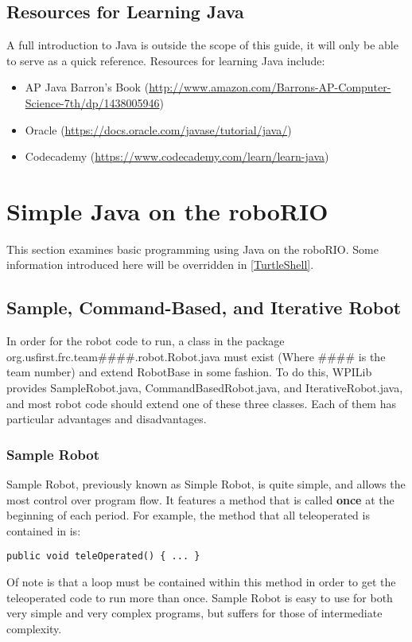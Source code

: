 \documentclass[]{report}
\begin{document}
\subsection{Resources for Learning Java}
A full introduction to Java is outside the scope of this guide, it will only be able to serve as a quick reference.
Resources for learning Java include:
\begin{itemize}
\item AP Java Barron's Book (\url{http://www.amazon.com/Barrons-AP-Computer-Science-7th/dp/1438005946})
\item Oracle (\url{https://docs.oracle.com/javase/tutorial/java/})
\item Codecademy (\url{https://www.codecademy.com/learn/learn-java})
\end{itemize}

\section{Simple Java on the roboRIO}
\label{SimpleJavaontheroboRIO}
This section examines basic programming using Java on the roboRIO.
Some information introduced here will be overridden in \ref{TurtleShell}.

\subsection{Sample, Command-Based, and Iterative Robot}
In order for the robot code to run, a class in the package org.usfirst.frc.team\#\#\#\#.robot.Robot.java must exist (Where \#\#\#\# is the team number) and extend RobotBase in some fashion.
To do this, WPILib provides SampleRobot.java, CommandBasedRobot.java, and IterativeRobot.java, and most robot code should extend one of these three classes.
Each of them has particular advantages and disadvantages.

\subsubsection{Sample Robot}
Sample Robot, previously known as Simple Robot, is quite simple, and allows the most control over program flow.
It features a method that is called \textbf{once} at the beginning of each period.
For example, the method that all teleoperated is contained in is:
\begin{lstlisting}
public void teleOperated() { ... }
\end{lstlisting}
Of note is that a loop must be contained within this method in order to get the teleoperated code to run more than once.
Sample Robot is easy to use for both very simple and very complex programs, but suffers for those of intermediate complexity.
\end{document}
